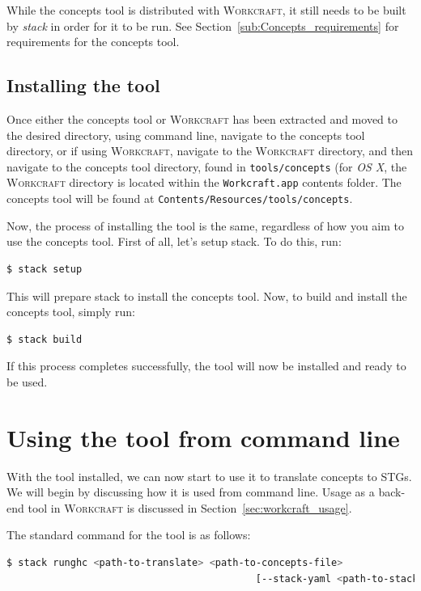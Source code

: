 \documentclass{proc}
\newcommand{\noun}[1]{\textsc{#1}}
\begin{document}
While the concepts tool is distributed with \noun{Workcraft}, it still needs to be built by \emph{stack} in order for it to be run. 
See Section~\ref{sub:Concepts_requirements} for requirements for the concepts tool.

\newpage
\subsection{Installing the tool}

Once either the concepts tool or \noun{Workcraft} has been extracted and moved to the desired directory, using command line, navigate to the concepts tool directory, or if using 
\noun{Workcraft}, navigate to the \noun{Workcraft} directory, and then navigate to the concepts tool directory, found in \texttt{tools/concepts} (for \emph{OS X}, the 
\noun{Workcraft} directory is located within the \texttt{Workcraft.app} contents folder. The concepts tool will be found at \texttt{Contents/Resources/tools/concepts}.

Now, the process of installing the tool is the same, regardless of how you aim to use the concepts tool. First of all, let's setup stack. To do this, run: 

\begin{lstlisting}[language=bash]
  $ stack setup
\end{lstlisting}

This will prepare stack to install the concepts tool. Now, to build and install the concepts tool, simply run:

\begin{lstlisting}[language=bash]
  $ stack build
\end{lstlisting}

If this process completes successfully, the tool will now be installed and ready to be used.

\section{Using the tool from command line}

With the tool installed, we can now start to use it to translate concepts to STGs. We will begin by discussing how it is used from command line. Usage as a back-end tool in 
\noun{Workcraft} is discussed in Section~\ref{sec:workcraft_usage}.

The standard command for the tool is as follows:

\begin{lstlisting}[language=bash]
  $ stack runghc <path-to-translate> <path-to-concepts-file> 
                                           [--stack-yaml <path-to-stack-file>]
\end{lstlisting}
\end{document}
